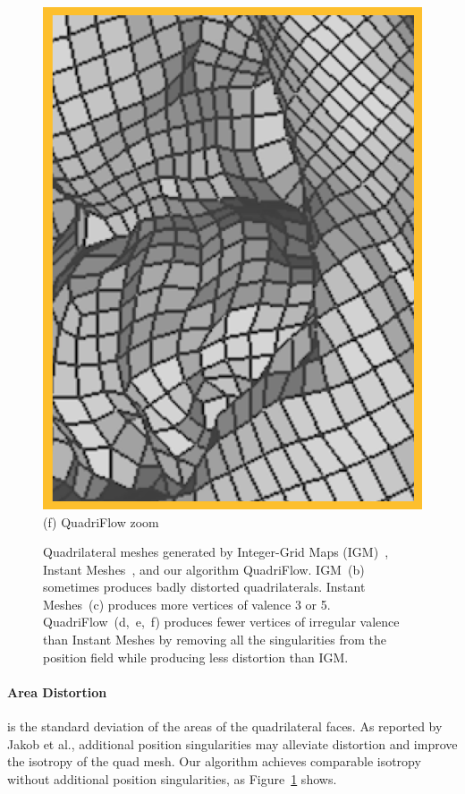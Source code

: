 \begin{figure}
\begin{minipage}{0.16\textwidth}
  \includegraphics[width=\textwidth,height=1.33\textwidth]{quadriflow/teaser/teasers2.png}\\
   (f) QuadriFlow zoom
   \end{minipage}

\caption{Quadrilateral meshes generated by Integer-Grid Maps (IGM)~\cite{bommes2013integer}, Instant Meshes~\cite{jakob2015instant}, and our algorithm QuadriFlow. IGM~(b) sometimes produces badly distorted quadrilaterals. Instant Meshes~(c) produces more vertices of valence 3 or 5. QuadriFlow~(d,~e,~f) produces fewer vertices of irregular valence than Instant Meshes by removing all the singularities from the position field while producing less distortion than IGM.}
\label{fig:quad-teaser}
\end{figure}
\paragraph*{Area Distortion} is the standard deviation of the areas of the quadrilateral faces. As reported by Jakob et al., additional position singularities may alleviate distortion and improve the isotropy of the quad mesh. Our algorithm achieves comparable isotropy without additional position singularities, as Figure~\ref{fig:quad-teaser} shows.

